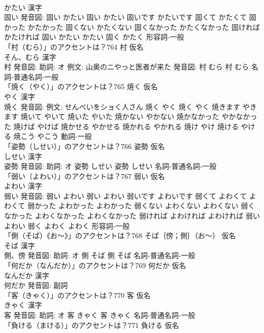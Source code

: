 \documentclass[8pt]{extreport}
\begin{document}
\begin{CJK}{UTF8}{min}
\\	かたい 漢字　
\\	固い 発音図:	固い かたい		固い かたい 固いです かたいです 固くて かたくて 固かった かたかった 固くない かたくない 固くなかった かたくなかった 固ければ かたければ 固い かたい かたい 固く かたく				形容詞-一般 
\\	「村（むら）」のアクセントは？764	村 仮名　
\\	そん、むら 漢字　
\\	村 発音図: 助詞: オ 例文: 山奥のニやっと医者が来た 発音図:	村 むら		村 むら				名詞-普通名詞-一般 
\\	「焼く（やく）」のアクセントは？765	焼く 仮名　
\\	やく 漢字　
\\	焼く 発音図: 例文: せんべいをショく人さん	焼く やく		焼く やく 焼きます やきます 焼いて やいて 焼いた やいた 焼かない やかない 焼かなかった やかなかった 焼けば やけば 焼かせる やかせる 焼かれる やかれる 焼け やけ 焼ける やける 焼こう やこう				動詞-一般 
\\	「姿勢（しせい）」のアクセントは？766	姿勢 仮名　
\\	しせい 漢字　
\\	姿勢 発音図: 助詞: オ	姿勢 しせい		姿勢 しせい				名詞-普通名詞-一般 
\\	「弱い（よわい）」のアクセントは？767	弱い 仮名　
\\	よわい 漢字　
\\	弱い 発音図:	弱い よわい		弱い よわい 弱いです よわいです 弱くて よわくて よわくて 弱かった よわかった よわかった 弱くない よわくない よわくない 弱くなかった よわくなかった よわくなかった 弱ければ よわければ よわければ 弱い よわい 弱く よわく よわく				形容詞-一般 
\\	「側（そば）《お〜》」のアクセントは？768	そば｛傍；側｝（お〜） 仮名　
\\	そば 漢字　
\\	側、傍 発音図: 助詞: オ	側 そば		側 そば				名詞-普通名詞-一般 
\\	「何だか（なんだか）」のアクセントは？769	何だか 仮名　
\\	なんだか 漢字　
\\	何だか 発音図:							副詞 
\\	「客（きゃく）」のアクセントは？770	客 仮名　
\\	きゃく 漢字　
\\	客 発音図: 助詞: オ	客 きゃく		客 きゃく				名詞-普通名詞-一般 
\\	「負ける（まける）」のアクセントは？771	負ける 仮名　

\end{CJK}
\end{document}
